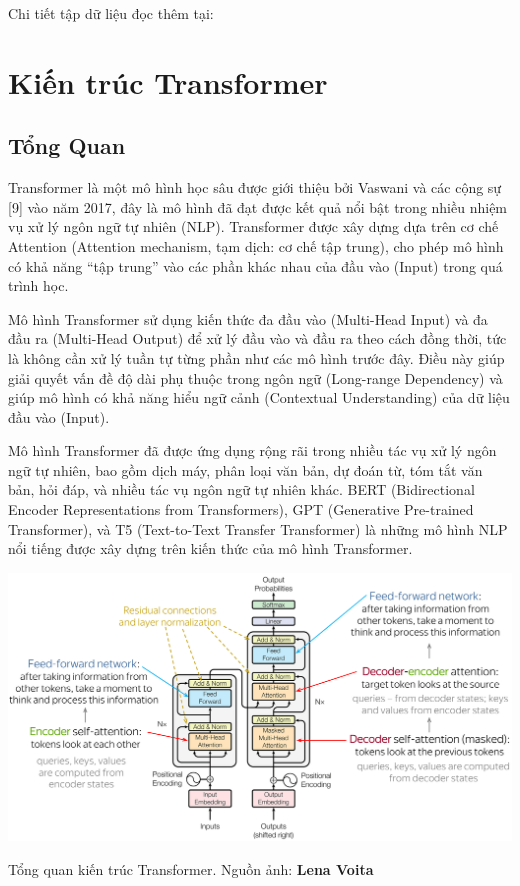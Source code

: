\documentclass[a4paper, 10pt]{article}
\begin{document}
Chi tiết tập dữ liệu đọc thêm tại: \cite{Clinton/Text-to-sql-v1}

\section{Kiến trúc Transformer}
\subsection{Tổng Quan}

Transformer là một mô hình học sâu được giới thiệu bởi Vaswani và các cộng sự [9]
vào năm 2017, đây là mô hình đã đạt được kết quả nổi bật trong nhiều nhiệm vụ xử lý
ngôn ngữ tự nhiên (NLP). Transformer được xây dựng dựa trên cơ chế Attention
(Attention mechanism, tạm dịch: cơ chế tập trung), cho phép mô hình có khả năng “tập 
trung” vào các phần khác nhau của đầu vào (Input) trong quá trình học.

Mô hình Transformer sử dụng kiến thức đa đầu vào (Multi-Head Input) và đa đầu 
ra (Multi-Head Output) để xử lý đầu vào và đầu ra theo cách đồng thời, tức là không cần 
xử lý tuần tự từng phần như các mô hình trước đây. Điều này giúp giải quyết vấn đề độ
dài phụ thuộc trong ngôn ngữ (Long-range Dependency) và giúp mô hình có khả năng 
hiểu ngữ cảnh (Contextual Understanding) của dữ liệu đầu vào (Input).

Mô hình Transformer đã được ứng dụng rộng rãi trong nhiều tác vụ xử lý ngôn ngữ
tự nhiên, bao gồm dịch máy, phân loại văn bản, dự đoán từ, tóm tắt văn bản, hỏi đáp, và 
nhiều tác vụ ngôn ngữ tự nhiên khác. BERT (Bidirectional Encoder Representations from 
Transformers), GPT (Generative Pre-trained Transformer), và T5 (Text-to-Text Transfer 
Transformer) là những mô hình NLP nổi tiếng được xây dựng trên kiến thức của mô hình 
Transformer.

\begin{minipage}{\linewidth}
    \captionsetup{type=figure}
    \centering
    \includegraphics[width=14cm]{./transformer.png}
    \caption{Tổng quan kiến trúc Transformer. Nguồn ảnh: \textbf{Lena Voita}}
\end{minipage}
\end{document}
